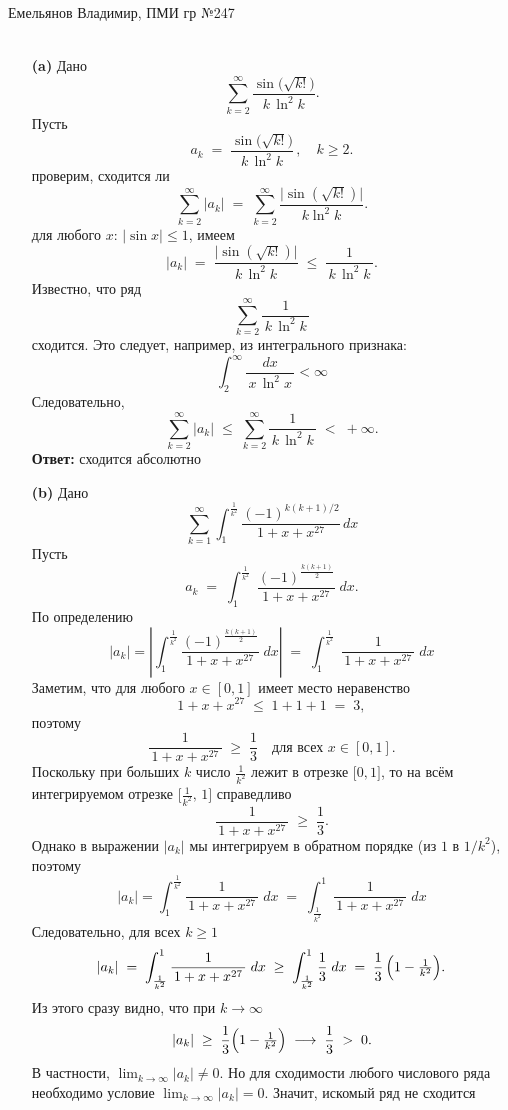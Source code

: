 \documentclass[a4paper]{article}
\renewcommand{\f}[2]{\frac{#1}{#2}}
\begin{document}
\section*{
\scalebox{0.9}{Домашнее задание на 08.06 (Математический анализ)}
}
{\large Емельянов Владимир, ПМИ гр №247}\\\\
\begin{enumerate}
  \item[\textbf{(a)}]Дано
  $$
  \sum_{k=2}^{\infty} \frac{\sin\bigl(\sqrt{k!}\bigr)}{\,k\,\ln^2 k\,}.
  $$
  Пусть
  $$
  a_k \;=\;\frac{\sin\bigl(\sqrt{k!}\bigr)}{\,k\,\ln^2 k\,}\,,\quad k\ge2.
  $$
  проверим, сходится ли
  $$
  \sum_{k=2}^\infty |a_k| \;=\;\sum_{k=2}^\infty \frac{\bigl|\sin(\sqrt{k!})\bigr|}{\,k\ln^2 k\,}.
  $$
  для любого $x$: $\bigl|\sin x\bigr|\le 1$, имеем
  $$
  |a_k| \;=\;\frac{\bigl|\sin(\sqrt{k!})\bigr|}{\,k\,\ln^2 k\,}\;\le\;\frac{1}{\,k\,\ln^2 k\,}.
  $$
  Известно, что ряд
  $$
  \sum_{k=2}^\infty \frac{1}{\,k\,\ln^2 k\,}
  $$
  сходится. Это следует, например, из интегрального признака:
  $$\displaystyle\int_2^\infty\frac{dx}{\,x\,\ln^2 x\,}<\infty$$
  Следовательно,
  $$
  \sum_{k=2}^\infty |a_k|
  \;\le\;
  \sum_{k=2}^\infty \frac{1}{\,k\,\ln^2 k\,}
  \;<\;+\infty.
  $$ 
  \textbf{Ответ: } сходится абсолютно\\

  \item[\textbf{(b)}]Дано
  $$\sum_{k=1}^{\infty} \int_1^\f{1}{k^2} \frac{(-1)^{k(k+1)/2}}{1 + x + x^{27}} \, dx$$
  Пусть
  $$
  a_k \;=\;\int_{1}^{\frac{1}{k^2}}\;\frac{(-1)^{\frac{k(k+1)}{2}}}{\,1 + x + x^{27}\,}\;dx.
  $$
  По определению
  $$
  |a_k|
  =
  \left|\int_{1}^{\frac{1}{k^2}} \frac{(-1)^{\frac{k(k+1)}{2}}}{1 + x + x^{27}}\;dx \right|
  \;=\;
  \int_{1}^{\frac{1}{k^2}}\; \frac{1}{\,1 + x + x^{27}\,}\;dx
  $$
  Заметим, что для любого $x\in[0,1]$ имеет место неравенство
  $$
  1 + x + x^{27} \;\le\; 1 + 1 + 1 \;=\; 3,
  $$
  поэтому
  $$
  \frac{1}{\,1 + x + x^{27}\,}\;\ge\;\frac{1}{3}
  \quad\text{для всех }x\in[0,1].
  $$
  Поскольку при больших $k$ число $\tfrac{1}{k^2}$ лежит в отрезке $\bigl[0,1\bigr]$, то на всём интегрируемом отрезке $\bigl[\tfrac{1}{k^2},\,1\bigr]$ справедливо
  $$
  \frac{1}{\,1 + x + x^{27}\,}\;\ge\;\frac{1}{3}.
  $$
  Однако в выражении $|a_k|$ мы интегрируем в обратном порядке (из $1$ в $1/k^2$), поэтому
  $$
  |a_k|
  =
  \int_{1}^{\frac{1}{k^2}} \frac{1}{\,1 + x + x^{27}\,}\;dx
  \;=\;
  \int_{\frac{1}{k^2}}^{1} \frac{1}{\,1 + x + x^{27}\,}\;dx
  $$
  Следовательно, для всех $k\ge1$
  $$
  |a_k|
  \;=\;
  \int_{\frac{1}{k^2}}^{1} \frac{1}{\,1 + x + x^{27}\,}\;dx
  \;\ge\;
  \int_{\frac{1}{k^2}}^{1} \frac{1}{3}\;dx
  \;=\;
  \frac{1}{3}\,\Bigl(1 - \tfrac{1}{k^2}\Bigr).
  $$
  Из этого сразу видно, что при $k \to \infty$
  $$
  |a_k| \;\ge\; \frac{1}{3}\Bigl(1 - \tfrac{1}{k^2}\Bigr)\;\longrightarrow\;\frac{1}{3} \;>\;0.
  $$
  В частности, $\displaystyle\lim_{k\to\infty} |a_k|\neq 0$. 
  Но для сходимости любого числового ряда необходимо условие $\lim_{k\to\infty} 
  |a_k| = 0$. Значит, искомый ряд не сходится


\end{enumerate}
\end{document}
